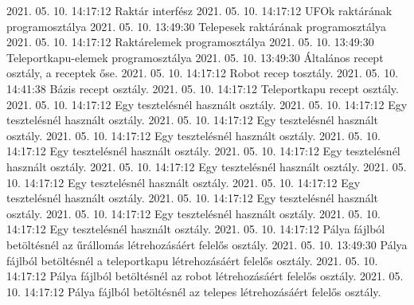  {2021. 05. 10. 14:17:12} {Raktár interfész}
 {2021. 05. 10. 14:17:12} {UFOk raktárának programosztálya}
 {2021. 05. 10. 13:49:30} {Telepesek raktárának programosztálya}
 {2021. 05. 10. 14:17:12} {Raktárelemek programosztálya}
 {2021. 05. 10. 13:49:30} {Teleportkapu-elemek programosztálya}
 {2021. 05. 10. 13:49:30} {Általános recept osztály, a receptek őse.}
 {2021. 05. 10. 14:17:12} {Robot recep tosztály.}
 {2021. 05. 10. 14:41:38} {Bázis recept osztály.}
 {2021. 05. 10. 14:17:12} {Teleportkapu recept osztály.}
 {2021. 05. 10. 14:17:12} {Egy tesztelésnél használt osztály.}
 {2021. 05. 10. 14:17:12} {Egy tesztelésnél használt osztály.}
 {2021. 05. 10. 14:17:12} {Egy tesztelésnél használt osztály.}
 {2021. 05. 10. 14:17:12} {Egy tesztelésnél használt osztály.}
 {2021. 05. 10. 14:17:12} {Egy tesztelésnél használt osztály.}
 {2021. 05. 10. 14:17:12} {Egy tesztelésnél használt osztály.}
 {2021. 05. 10. 14:17:12} {Egy tesztelésnél használt osztály.}
 {2021. 05. 10. 14:17:12} {Egy tesztelésnél használt osztály.}
 {2021. 05. 10. 14:17:12} {Egy tesztelésnél használt osztály.}
 {2021. 05. 10. 14:17:12} {Egy tesztelésnél használt osztály.}
 {2021. 05. 10. 14:17:12} {Egy tesztelésnél használt osztály.}
 {2021. 05. 10. 14:17:12} {Egy tesztelésnél használt osztály.}
 {2021. 05. 10. 14:17:12} {Pálya fájlból betöltésnél az űrállomás létrehozásáért felelős osztály.}
 {2021. 05. 10. 13:49:30} {Pálya fájlból betöltésnél a teleportkapu létrehozásáért felelős osztály.}
 {2021. 05. 10. 14:17:12} {Pálya fájlból betöltésnél az robot létrehozásáért felelős osztály.}
 {2021. 05. 10. 14:17:12} {Pálya fájlból betöltésnél az telepes létrehozásáért felelős osztály.}
